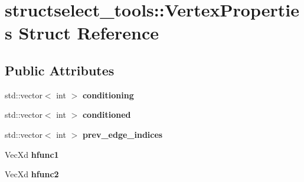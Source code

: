\hypertarget{structstructselect__tools_1_1_vertex_properties}{\section{structselect\+\_\+tools\+:\+:Vertex\+Properties Struct Reference}
\label{structstructselect__tools_1_1_vertex_properties}
}
\subsection*{Public Attributes}
\begin{DoxyCompactItemize}
\item 
\hypertarget{structstructselect__tools_1_1_vertex_properties_ae98731fd772dc856678430a58c89a59c}{std\+::vector$<$ int $>$ {\bfseries conditioning}}\label{structstructselect__tools_1_1_vertex_properties_ae98731fd772dc856678430a58c89a59c}

\item 
\hypertarget{structstructselect__tools_1_1_vertex_properties_a55e4762ff80a2764ad3108296461f1eb}{std\+::vector$<$ int $>$ {\bfseries conditioned}}\label{structstructselect__tools_1_1_vertex_properties_a55e4762ff80a2764ad3108296461f1eb}

\item 
\hypertarget{structstructselect__tools_1_1_vertex_properties_a4417fead3115618173f27aa82dc2a892}{std\+::vector$<$ int $>$ {\bfseries prev\+\_\+edge\+\_\+indices}}\label{structstructselect__tools_1_1_vertex_properties_a4417fead3115618173f27aa82dc2a892}

\item 
\hypertarget{structstructselect__tools_1_1_vertex_properties_a02eb01c5bac207cda84e1bb774af31e0}{Vec\+Xd {\bfseries hfunc1}}\label{structstructselect__tools_1_1_vertex_properties_a02eb01c5bac207cda84e1bb774af31e0}

\item 
\hypertarget{structstructselect__tools_1_1_vertex_properties_a4944630229999934498193b125540b72}{Vec\+Xd {\bfseries hfunc2}}\label{structstructselect__tools_1_1_vertex_properties_a4944630229999934498193b125540b72}

\end{DoxyCompactItemize}
